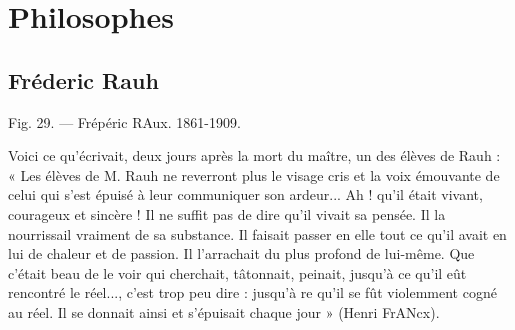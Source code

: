 
\chapter{Philosophes}

\section{Fréderic Rauh}
%
Fig. 29. — Frépéric RAux.
1861-1909.

Voici ce qu'écrivait, deux jours après la mort
du maître, un des élèves de Rauh : « Les élèves
de M. Rauh ne reverront plus le visage cris
et la voix émouvante de celui qui s'est épuisé
à leur communiquer son ardeur... Ah ! qu'il
était vivant, courageux et sincère ! Il ne suffit
pas de dire qu'il vivait sa pensée. Il la
nourrissail vraiment de sa substance. Il faisait
passer en elle tout ce qu’il avait en
lui de chaleur et de passion. Il l'arrachait
du plus profond de lui-même. Que c'était
beau de le voir qui cherchait, tâtonnait, peinait,
jusqu'à ce qu'il eût rencontré le réel...,
c'est trop peu dire : jusqu'à re qu'il se fût
violemment cogné au réel. Il se donnait ainsi
et s'épuisait chaque jour » (Henri FrANcx).

